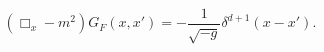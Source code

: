 \begin{equation} \label{feynman diffeq}
(\Box _x - m^2) G_F(x,x') = -\frac{1}{\sqrt{-g}} \delta^{d+1}(x-x') .
\end{equation}

